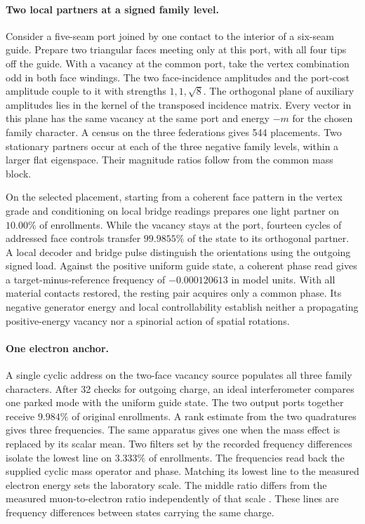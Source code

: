 \documentclass[11pt]{article}
\theoremstyle{definition}
\theoremstyle{remark}
\theoremstyle{plain}
\begin{document}
\paragraph{Two local partners at a signed family level.}
Consider a five-seam port joined by one contact to the interior of a
six-seam guide. Prepare two triangular faces meeting only at this
port, with all four tips off the guide. With a vacancy at the common
port, take the vertex combination odd in both face windings. The two
face-incidence amplitudes and the port-cost amplitude couple to it
with strengths $1,1,\sqrt{8}$. The orthogonal plane of auxiliary
amplitudes lies in the kernel of the transposed incidence matrix.
Every vector in this plane has the same vacancy at the same port and
energy $-m$ for the chosen family character. A census on the three
federations gives 544 placements. Two stationary partners occur at
each of the three negative family levels, within a larger flat
eigenspace. Their magnitude ratios follow from the common mass block.

On the selected placement, starting from a coherent face pattern in
the vertex grade and conditioning on local bridge readings prepares
one light partner on $10.00\%$ of enrollments. While the vacancy stays
at the port, fourteen cycles of addressed face controls transfer
$99.9855\%$ of the state to its orthogonal partner. A local decoder
and bridge pulse distinguish the orientations using the outgoing signed
load. Against the positive uniform guide state, a coherent phase read
gives a target-minus-reference frequency of $-0.000120613$ in model
units. With all material contacts restored, the resting pair acquires
only a common phase. Its negative generator energy and local
controllability establish neither a propagating positive-energy
vacancy nor a spinorial action of spatial rotations.

\paragraph{One electron anchor.}
A single cyclic address on the two-face vacancy source populates all
three family characters. After 32 checks for outgoing charge, an ideal
interferometer compares one parked mode with the uniform guide state.
The two output ports together receive $9.984\%$ of original enrollments.
A rank estimate from the two quadratures gives three frequencies. The
same apparatus gives one when the mass effect is replaced by its scalar
mean. Two filters set by the recorded frequency differences isolate the
lowest line on $3.333\%$ of enrollments. The frequencies read back the supplied cyclic mass operator and phase. Matching its lowest line to the measured electron energy sets the laboratory scale. The middle ratio differs from the measured muon-to-electron ratio independently of that scale
\cite{pdgleptons2026,codata2022ratio}. These lines are frequency
differences between states carrying the same charge.
\end{document}
